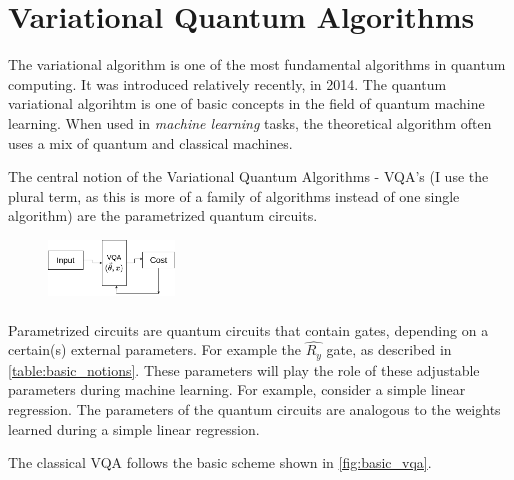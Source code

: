 \section{Variational Quantum Algorithms}
The variational algorithm is one of the most fundamental algorithms 
in quantum computing. It was introduced relatively recently, in 2014. 
The quantum variational algorihtm is one of basic concepts in the field of quantum machine learning. 
When used in \textit{machine learning} tasks, the theoretical algorithm often uses a mix of quantum and classical machines.

The central notion of the Variational Quantum Algorithms - VQA's (I use the plural term, as this is more 
of a family of algorithms instead of one single algorithm) are the parametrized quantum circuits. 

\begin{figure}
  \includegraphics[width=0.3\textwidth]{./basic_vqa.png}
  \caption{}
  \label{fig:basic_vqa}
\end{figure}

\paragraph{} Parametrized circuits are quantum circuits that contain gates, depending on a certain(s) external parameters. 
For example the $\widehat{R_y}$ gate, as described in \autoref{table:basic_notions}.
These parameters will play the role of these adjustable parameters during machine learning. For example, consider a simple 
linear regression. The parameters of the quantum circuits are analogous to the weights learned during a simple linear 
regression.

The classical VQA follows the basic scheme shown in \autoref{fig:basic_vqa}.

